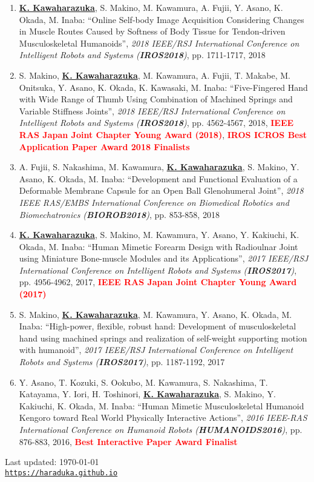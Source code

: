 \documentclass[letterpaper]{article}
\def\footerlink{https://haraduka.github.io}
\begin{document}
\begin{enumerate}
\item \underline{\textbf{K. Kawaharazuka}}, S. Makino, M. Kawamura, A. Fujii, Y. Asano, K. Okada, M. Inaba: ``Online Self-body Image Acquisition Considering Changes in Muscle Routes Caused by Softness of Body Tissue for Tendon-driven Musculoskeletal Humanoids'', \textit{2018 IEEE/RSJ International Conference on Intelligent Robots and Systems (\textit{\textbf{IROS2018}})}, pp. 1711-1717, 2018
\item S. Makino, \underline{\textbf{K. Kawaharazuka}}, M. Kawamura, A. Fujii, T. Makabe, M. Onitsuka, Y. Asano, K. Okada, K. Kawasaki, M. Inaba: ``Five-Fingered Hand with Wide Range of Thumb Using Combination of Machined Springs and Variable Stiffness Joints'', \textit{2018 IEEE/RSJ International Conference on Intelligent Robots and Systems (\textit{\textbf{IROS2018}})}, pp. 4562-4567, 2018, \textbf{\textcolor{red}{IEEE RAS Japan Joint Chapter Young Award (2018)}}, \textbf{\textcolor{red}{IROS ICROS Best Application Paper Award 2018 Finalists}}
\item A. Fujii, S. Nakashima, M. Kawamura, \underline{\textbf{K. Kawaharazuka}}, S. Makino, Y. Asano, K. Okada, M. Inaba: ``Development and Functional Evaluation of a Deformable Membrane Capsule for an Open Ball Glenohumeral Joint'', \textit{2018 IEEE RAS/EMBS International Conference on Biomedical Robotics and Biomechatronics (\textit{\textbf{BIOROB2018}})}, pp. 853-858, 2018
\item \underline{\textbf{K. Kawaharazuka}}, S. Makino, M. Kawamura, Y. Asano, Y. Kakiuchi, K. Okada, M. Inaba: ``Human Mimetic Forearm Design with Radioulnar Joint using Miniature Bone-muscle Modules and its Applications'', \textit{2017 IEEE/RSJ International Conference on Intelligent Robots and Systems (\textit{\textbf{IROS2017}})}, pp. 4956-4962, 2017, \textbf{\textcolor{red}{IEEE RAS Japan Joint Chapter Young Award (2017)}}
\item S. Makino, \underline{\textbf{K. Kawaharazuka}}, M. Kawamura, Y. Asano, K. Okada, M. Inaba: ``High-power, flexible, robust hand: Development of musculoskeletal hand using machined springs and realization of self-weight supporting motion with humanoid'', \textit{2017 IEEE/RSJ International Conference on Intelligent Robots and Systems (\textit{\textbf{IROS2017}})}, pp. 1187-1192, 2017
\item Y. Asano, T. Kozuki, S. Ookubo, M. Kawamura, S. Nakashima, T. Katayama, Y. Iori, H. Toshinori, \underline{\textbf{K. Kawaharazuka}}, S. Makino, Y. Kakiuchi, K. Okada, M. Inaba: ``Human Mimetic Musculoskeletal Humanoid Kengoro toward Real World Physically Interactive Actions'', \textit{2016 IEEE-RAS International Conference on Humanoid Robots (\textit{\textbf{HUMANOIDS2016}})}, pp. 876-883, 2016, \textbf{\textcolor{red}{Best Interactive Paper Award Finalist}}
\end{enumerate}


\bigskip

\begin{center}
  \begin{footnotesize}
    Last updated: \today \\
    \href{\footerlink}{\texttt{\footerlink}}
  \end{footnotesize}
\end{center}
\end{document}
